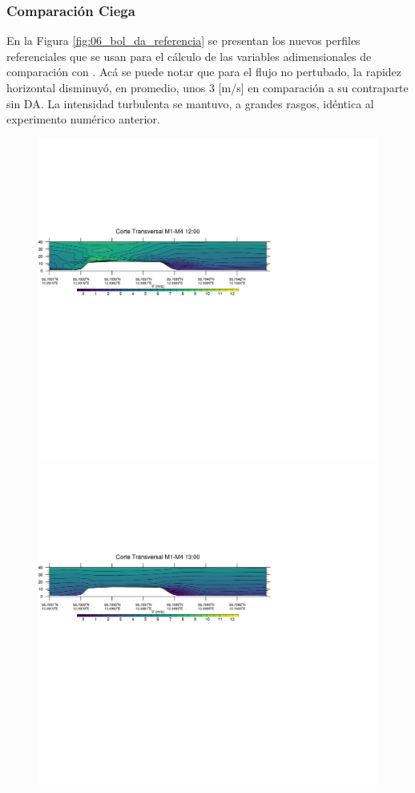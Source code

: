 \subsubsection{Comparación Ciega}
En la Figura \ref{fig:06_bol_da_referencia} se presentan los nuevos perfiles referenciales que se usan para el cálculo de las variables adimensionales de comparación con \cite{Bechmann2011}. Acá se puede notar que para el flujo no pertubado, la rapidez horizontal disminuyó, en promedio, unos 3 [m/s] en comparación a su contraparte sin DA. La intensidad turbulenta se mantuvo, a grandes rasgos, idéntica al experimento numérico anterior.
\newpage
\vspace*{\fill}
\begin{figure}[H]
	\centering
	\includegraphics[width=0.90\linewidth,trim={0mm 202.0mm 111mm 106mm},clip]{Imagenes/06/bol_da/1200rot}\\%
	\includegraphics[width=0.90\linewidth,trim={0mm 202.0mm 111mm 106mm},clip]{Imagenes/06/bol_da/1300rot}\\%

\end{figure}
